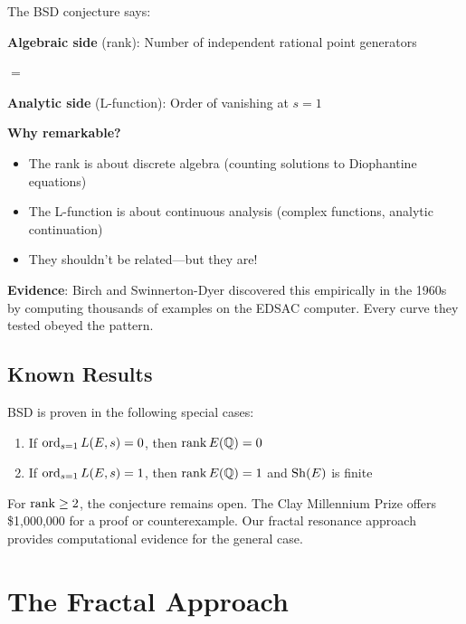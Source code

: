 \begin{intuitive}
The BSD conjecture says:

\textbf{Algebraic side} (rank): Number of independent rational point generators

$=$

\textbf{Analytic side} (L-function): Order of vanishing at $s = 1$

\textbf{Why remarkable?}
\begin{itemize}
\item The rank is about discrete algebra (counting solutions to Diophantine equations)
\item The L-function is about continuous analysis (complex functions, analytic continuation)
\item They shouldn't be related—but they are!
\end{itemize}

\textbf{Evidence}: Birch and Swinnerton-Dyer discovered this empirically in the 1960s by computing thousands of examples on the EDSAC computer. Every curve they tested obeyed the pattern.
\end{intuitive}

\subsection{Known Results}

\begin{theorem}\label{thm:gross-zagier-kolyvagin}
BSD is proven in the following special cases\cite{gross1986heegner,kolyvagin1988finiteness}:
\begin{enumerate}
\item If $\operatorname{ord}_{s=1} L(E,s) = 0$, then $\operatorname{rank} E(\mathbb{Q}) = 0$
\item If $\operatorname{ord}_{s=1} L(E,s) = 1$, then $\operatorname{rank} E(\mathbb{Q}) = 1$ and $\mathrm{Sh}(E)$ is finite
\end{enumerate}
\end{theorem}

\begin{remark}
For $\operatorname{rank} \geq 2$, the conjecture remains open. The Clay Millennium Prize offers \$1,000,000 for a proof or counterexample. Our fractal resonance approach provides computational evidence for the general case.
\end{remark}

\section{The Fractal Approach}

